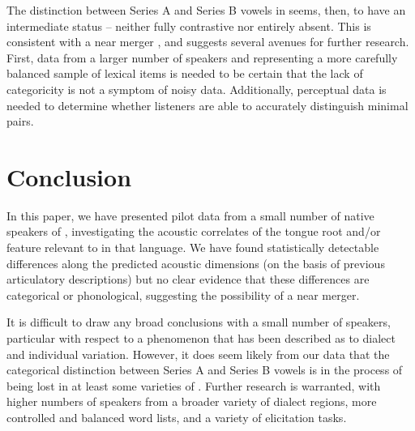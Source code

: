 \documentclass[output=paper,newtxmath,modfonts,nonflat,hidelinks]{langsci/langscibook}
\begin{document}
The distinction between Series A and Series B vowels in  seems, then, to have an intermediate status -- neither fully contrastive nor entirely absent.  This is consistent with a near merger \citep{Labovetal1972}, and suggests several avenues for further research.  First, data from a larger number of speakers and representing a more carefully balanced sample of lexical items is needed to be certain that the lack of categoricity is not a symptom of noisy data.  Additionally, perceptual data is needed to determine whether listeners are able to accurately distinguish minimal pairs.  

\section{Conclusion}

In this paper, we have presented pilot data from a small number of native speakers of , investigating the acoustic correlates of the tongue root and/or  feature relevant to  in that language.  We have found statistically detectable differences along the predicted acoustic dimensions (on the basis of previous articulatory descriptions) but no clear evidence that these differences are categorical or phonological, suggesting the possibility of a near merger.

It is difficult to draw any broad conclusions with a small number of speakers, particular with respect to a phenomenon that has been described as  to dialect and individual variation.  However, it does seem likely from our data that the categorical distinction between Series A and Series B vowels is in the process of being lost in at least some varieties of .  Further research is warranted, with higher numbers of speakers from a broader variety of dialect regions, more controlled and balanced word lists, and a variety of elicitation tasks.

{\sloppy
\printbibliography[heading=subbibliography,notkeyword=this]}
\end{document}
